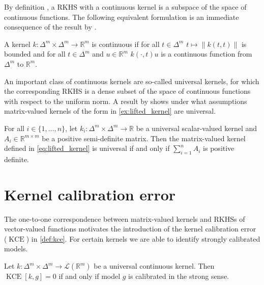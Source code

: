 \documentclass{article}
\DeclareMathOperator{\kernelmeasure}{KCE}
\begin{document}
By definition
\citep[see, e.g.,][Definition~1]{carmeli10_vector_valued_reprod_kernel_hilber_spaces_univer},
a RKHS with a continuous kernel is a subspace of the space of continuous
functions. The following equivalent formulation is an immediate consequence of
the result by \citet{carmeli10_vector_valued_reprod_kernel_hilber_spaces_univer}.

\begin{corollary}
  A kernel $k \colon \Delta^m \times \Delta^m \to \mathbb{R}^m$ is continuous if
  for all $t \in \Delta^m$ $t \mapsto \|k(t, t)\|$ is bounded and for all
  $t \in \Delta^m$ and $u \in \mathbb{R}^m$ $k(\cdot, t) u$ is a continuous
  function from $\Delta^m$ to $\mathbb{R}^m$.
\end{corollary}

An important class of continuous kernels are so-called universal kernels, for
which the corresponding RKHS is a dense subset of the space of continuous
functions with respect to the uniform norm. A result by
\citet{caponnetto08_univer_multi_task_kernel} shows under what assumptions
matrix-valued kernels of the form in \cref{ex:lifted_kernel} are universal.

\begin{lemma}\label{lemma:lifted_kernel}
  For all $i \in \{1, \ldots, n\}$, let
  $k_i \colon \Delta^m \times \Delta^m \to \mathbb{R}$ be a universal
  scalar-valued kernel and $A_i \in \mathbb{R}^{m \times m}$ be a positive
  semi-definite matrix. Then the matrix-valued kernel defined in
  \cref{eq:lifted_kernel} is universal if and only if $\sum_{i=1}^n A_i$ is
  positive definite.
\end{lemma}

\section{Kernel calibration error}

The one-to-one correspondence between matrix-valued kernels and RKHSs of
vector-valued functions motivates the introduction of the kernel calibration
error ($\kernelmeasure$) in \cref{def:kce}. For certain kernels we are able to
identify strongly calibrated models.

\begin{theorem}\label{thm:ce_rkhs}
  Let $k \colon \Delta^m \times \Delta^m \to \mathcal{L}(\mathbb{R}^m)$ be a
  universal continuous kernel. Then $\kernelmeasure[k, g] = 0$ if and only if
  model $g$ is calibrated in the strong sense.
\end{theorem}
\end{document}
